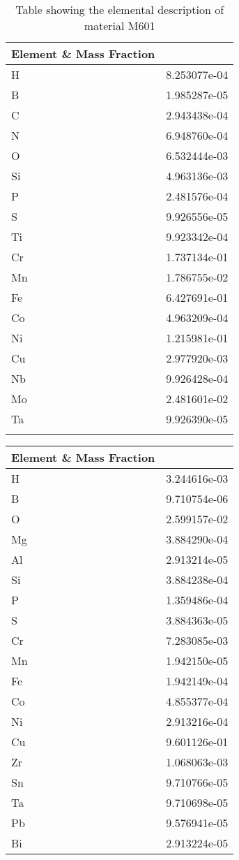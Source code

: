 \begin{centering}
\begin{longtable}[ht!]
\caption{Table showing the elemental description of material M925}
\label{table:material_EppMix}
\end{longtable}
\clearpage

\begin{longtable}[ht!]
{ p{} | p{} }
\hline
Element \& Mass Fraction\\
\hline
H &  8.253077e-04\\
B &  1.985287e-05\\
C &  2.943438e-04\\
N &  6.948760e-04\\
O &  6.532444e-03\\
Si &  4.963136e-03\\
P &  2.481576e-04\\
S &  9.926556e-05\\
Ti &  9.923342e-04\\
Cr &  1.737134e-01\\
Mn &  1.786755e-02\\
Fe &  6.427691e-01\\
Co &  4.963209e-04\\
Ni &  1.215981e-01\\
Cu &  2.977920e-03\\
Nb &  9.926428e-04\\
Mo &  2.481601e-02\\
Ta &  9.926390e-05\\

\caption{Table showing the elemental description of material M601}
\label{table:material_M601}
\end{longtable}
\clearpage

\begin{longtable}[ht!]
{ p{} | p{} }
\hline
Element \& Mass Fraction\\
\hline
H &  3.244616e-03\\
B &  9.710754e-06\\
O &  2.599157e-02\\
Mg &  3.884290e-04\\
Al &  2.913214e-05\\
Si &  3.884238e-04\\
P &  1.359486e-04\\
S &  3.884363e-05\\
Cr &  7.283085e-03\\
Mn &  1.942150e-05\\
Fe &  1.942149e-04\\
Co &  4.855377e-04\\
Ni &  2.913216e-04\\
Cu &  9.601126e-01\\
Zr &  1.068063e-03\\
Sn &  9.710766e-05\\
Ta &  9.710698e-05\\
Pb &  9.576941e-05\\
Bi &  2.913224e-05\\


\end{longtable}
\end{centering}

